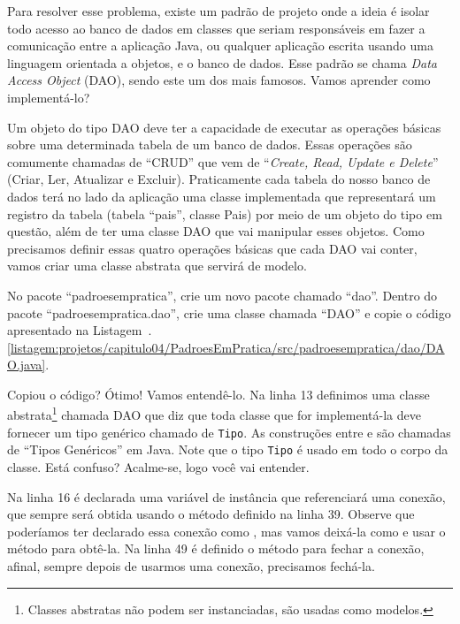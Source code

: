 Para resolver esse problema, existe um padrão de projeto onde a ideia é isolar todo acesso ao banco de dados em classes que seriam responsáveis em fazer a comunicação entre a aplicação Java, ou qualquer aplicação escrita usando uma linguagem orientada a objetos, e o banco de dados. Esse padrão se chama \textit{Data Access Object} (DAO), sendo este um dos mais famosos. Vamos aprender como implementá-lo?

Um objeto do tipo DAO deve ter a capacidade de executar as operações básicas sobre uma determinada tabela de um banco de dados. Essas operações são comumente chamadas de ``CRUD'' que vem de ``\textit{Create, Read, Update e Delete}'' (Criar, Ler, Atualizar e Excluir). Praticamente cada tabela do nosso banco de dados terá no lado da aplicação uma classe implementada que representará um registro da tabela (tabela ``pais'', classe Pais) por meio de um objeto do tipo em questão, além de ter uma classe DAO que vai manipular esses objetos. Como precisamos definir essas quatro operações básicas que cada DAO vai conter, vamos criar uma classe abstrata que servirá de modelo.

No pacote ``padroesempratica'', crie um novo pacote chamado ``dao''. Dentro do pacote ``padroesempratica.dao'', crie uma classe chamada ``DAO'' e copie o código apresentado na Listagem~\thechapter.\ref{listagem:projetos/capitulo04/PadroesEmPratica/src/padroesempratica/dao/DAO.java}.


Copiou o código? Ótimo! Vamos entendê-lo. Na linha 13 definimos uma classe abstrata\footnote{Classes abstratas não podem ser instanciadas, são usadas como modelos.} chamada DAO que diz que toda classe que for implementá-la deve fornecer um tipo genérico chamado de \texttt{Tipo}. As construções entre \inlineJavaCode{<} e \inlineJavaCode{>} são chamadas de ``Tipos Genéricos'' em Java. Note que o tipo \texttt{Tipo} é usado em todo o corpo da classe. Está confuso? Acalme-se, logo você vai entender.

Na linha 16 é declarada uma variável de instância que referenciará uma conexão, que sempre será obtida usando o método  definido na linha 39. Observe que poderíamos ter declarado essa conexão como , mas vamos deixá-la como  e usar o método  para obtê-la. Na linha 49 é definido o método para fechar a conexão, afinal, sempre depois de usarmos uma conexão, precisamos fechá-la.

